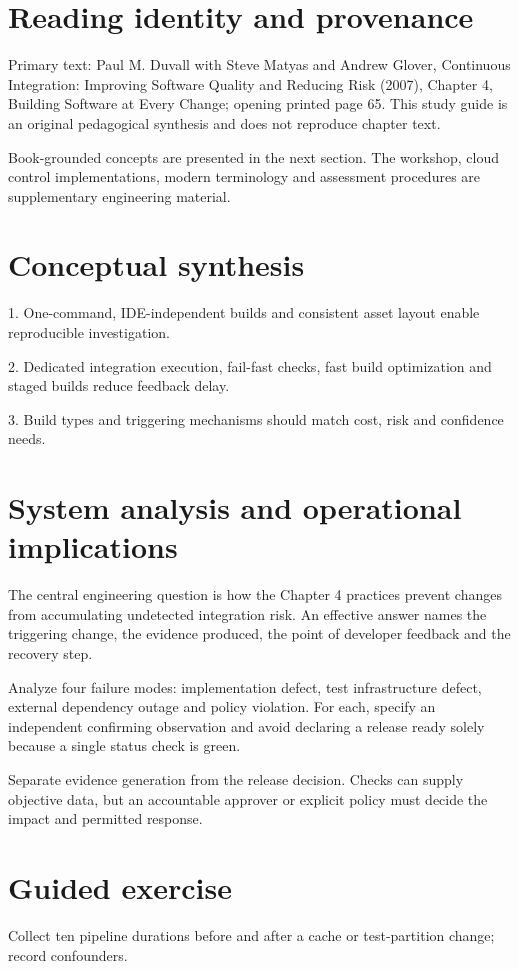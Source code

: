 \documentclass[11pt,letterpaper]{article}
\begin{document}
\makedoctitle
\makedocsummary
\tableofcontents
\clearpage
\section{Reading identity and provenance}
Primary text: Paul M. Duvall with Steve Matyas and Andrew Glover, Continuous Integration: Improving Software Quality and Reducing Risk (2007), Chapter 4, Building Software at Every Change; opening printed page 65. This study guide is an original pedagogical synthesis and does not reproduce chapter text.

Book-grounded concepts are presented in the next section. The workshop, cloud control implementations, modern terminology and assessment procedures are supplementary engineering material.

\section{Conceptual synthesis}
1. One-command, IDE-independent builds and consistent asset layout enable reproducible investigation.

2. Dedicated integration execution, fail-fast checks, fast build optimization and staged builds reduce feedback delay.

3. Build types and triggering mechanisms should match cost, risk and confidence needs.

\section{System analysis and operational implications}
The central engineering question is how the Chapter 4 practices prevent changes from accumulating undetected integration risk. An effective answer names the triggering change, the evidence produced, the point of developer feedback and the recovery step.

Analyze four failure modes: implementation defect, test infrastructure defect, external dependency outage and policy violation. For each, specify an independent confirming observation and avoid declaring a release ready solely because a single status check is green.

Separate evidence generation from the release decision. Checks can supply objective data, but an accountable approver or explicit policy must decide the impact and permitted response.

\section{Guided exercise}
Collect ten pipeline durations before and after a cache or test-partition change; record confounders.
\end{document}
